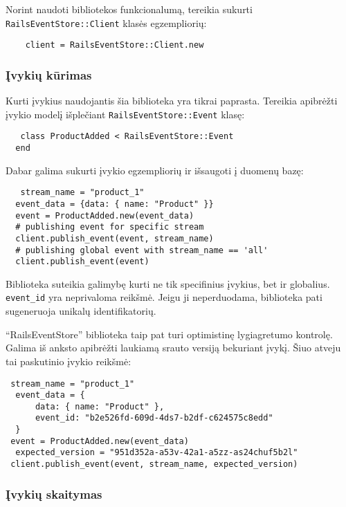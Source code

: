 Norint naudoti bibliotekos funkcionalumą, tereikia sukurti \lstinline|RailsEventStore::Client| klasės egzempliorių:

\begin{lstlisting}[]
    client = RailsEventStore::Client.new
\end{lstlisting}

\subsubsection{Įvykių kūrimas}

Kurti įvykius naudojantis šia biblioteka yra tikrai paprasta. Tereikia apibrėžti įvykio modelį išplečiant \lstinline{RailsEventStore::Event} klasę:

\begin{lstlisting}[]
   class ProductAdded < RailsEventStore::Event 
  end
\end{lstlisting}

Dabar galima sukurti įvykio egzempliorių ir išsaugoti į duomenų bazę:

\begin{lstlisting}[]
   stream_name = "product_1" 
  event_data = {data: { name: "Product" }}
  event = ProductAdded.new(event_data)
  # publishing event for specific stream
  client.publish_event(event, stream_name)
  # publishing global event with stream_name == 'all'
  client.publish_event(event)
\end{lstlisting}

Biblioteka suteikia galimybę kurti ne tik specifinius įvykius, bet ir globalius. \lstinline|event_id| yra neprivaloma reikšmė. Jeigu ji neperduodama, biblioteka pati sugeneruoja unikalų identifikatorių.

``RailsEventStore'' biblioteka taip pat turi optimistinę lygiagretumo kontrolę. Galima iš anksto apibrėžti laukiamą srauto versiją bekuriant įvykį. Šiuo atveju tai paskutinio įvykio reikšmė:

\begin{lstlisting}[]
 stream_name = "product_1" 
  event_data = { 
      data: { name: "Product" }, 
      event_id: "b2e526fd-609d-4ds7-b2df-c624575c8edd" 
  }
 event = ProductAdded.new(event_data) 
  expected_version = "951d352a-a53v-42a1-a5zz-as24chuf5b2l"
 client.publish_event(event, stream_name, expected_version)
\end{lstlisting}

\subsubsection{Įvykių skaitymas}

